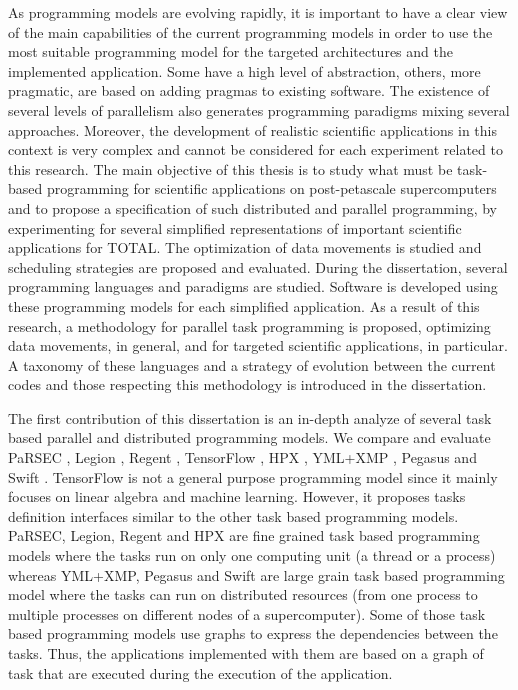 As programming models are evolving rapidly, it is important to have a clear view of the main capabilities of the current programming models in order to use the most suitable programming model for the targeted architectures and the implemented application.
Some have a high level of abstraction, others, more pragmatic, are based on adding pragmas to existing software.
The existence of several levels of parallelism also generates programming paradigms mixing several approaches.
Moreover, the development of realistic scientific applications in this context is very complex and cannot be considered for each experiment related to this research.
The main objective of this thesis is to study what must be task-based programming for scientific applications on post-petascale supercomputers and to propose a specification of such distributed and parallel programming, by experimenting for several simplified representations of important scientific applications for TOTAL.
The optimization of data movements is studied and scheduling strategies are proposed and evaluated.
During the dissertation, several programming languages and paradigms are studied.
Software is developed using these programming models for each simplified application.
As a result of this research, a methodology for parallel task programming is proposed, optimizing data movements, in general, and for targeted scientific applications, in particular.
A taxonomy of these languages and a strategy of evolution between the current codes and those respecting this methodology is introduced in the dissertation.

The first contribution of this dissertation is an in-depth analyze of several task based parallel and distributed programming models.
We compare and evaluate PaRSEC \cite{BBDHL2011}, Legion \cite{BaTSA2012}, Regent \cite{SLTBA2015}, TensorFlow \cite{AABBC2016}, HPX \cite{KHASF2014}, YML+XMP \cite{DelaP2004}, Pegasus \cite{DSSBG2005} and Swift \cite{ZHCFL2007}.
TensorFlow is not a general purpose programming model since it mainly focuses on linear algebra and machine learning.
However, it proposes tasks definition interfaces similar to the other task based programming models.
PaRSEC, Legion, Regent and HPX are fine grained task based programming models where the tasks run on only one computing unit (a thread or a process) whereas YML+XMP, Pegasus and Swift are large grain task based programming model where the tasks can run on distributed resources (from one process to multiple processes on different nodes of a supercomputer).
Some of those task based programming models use graphs to express the dependencies between the tasks.
Thus, the applications implemented with them are based on a graph of task that are executed during the execution of the application.

